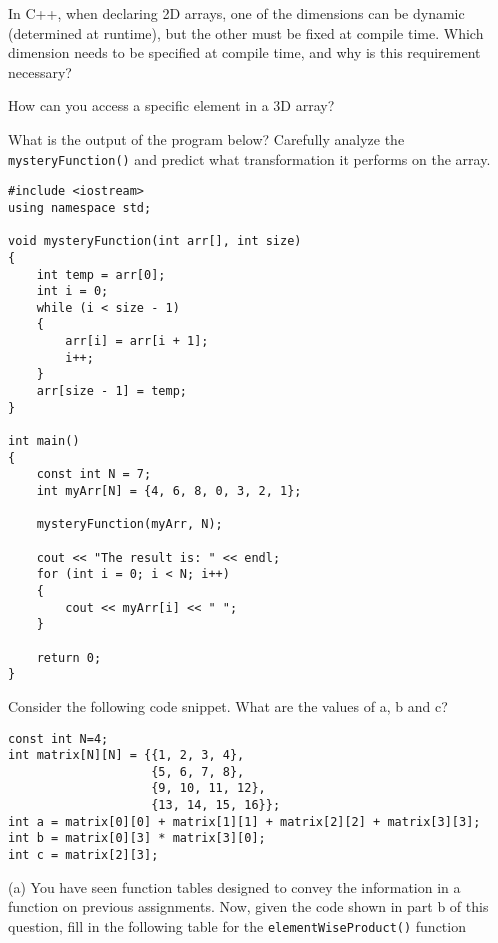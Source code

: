 \begin{problem}
    In C++, when declaring 2D arrays, one of the dimensions can be dynamic (determined at runtime), but the other must be fixed at compile time. Which dimension needs to be specified at compile time, and why is this requirement necessary?
\end{problem}

\begin{problem}
    How can you access a specific element in a 3D array?
\end{problem}

\begin{problem}
    What is the output of the program below? Carefully analyze the \texttt{mysteryFunction()} and predict what transformation it performs on the array.

\begin{verbatim}
#include <iostream>
using namespace std;

void mysteryFunction(int arr[], int size)
{
    int temp = arr[0];
    int i = 0;
    while (i < size - 1) 
    {
        arr[i] = arr[i + 1];
        i++;
    }
    arr[size - 1] = temp;
}

int main() 
{
    const int N = 7;
    int myArr[N] = {4, 6, 8, 0, 3, 2, 1};

    mysteryFunction(myArr, N);

    cout << "The result is: " << endl;
    for (int i = 0; i < N; i++) 
    {
        cout << myArr[i] << " ";
    }

    return 0;
}
\end{verbatim}
\end{problem}


\begin{problem}
    Consider the following code snippet. What are the values of a, b and c?

\begin{verbatim}
const int N=4;
int matrix[N][N] = {{1, 2, 3, 4}, 
                    {5, 6, 7, 8}, 
                    {9, 10, 11, 12}, 
                    {13, 14, 15, 16}};
int a = matrix[0][0] + matrix[1][1] + matrix[2][2] + matrix[3][3];
int b = matrix[0][3] * matrix[3][0];
int c = matrix[2][3];
\end{verbatim}
\end{problem}

\begin{problem}
    (a) You have seen function tables designed to convey the information in a function on previous assignments. Now, given the code shown in part b of this question, fill in the following table for the \texttt{elementWiseProduct()} function
\end{problem}

